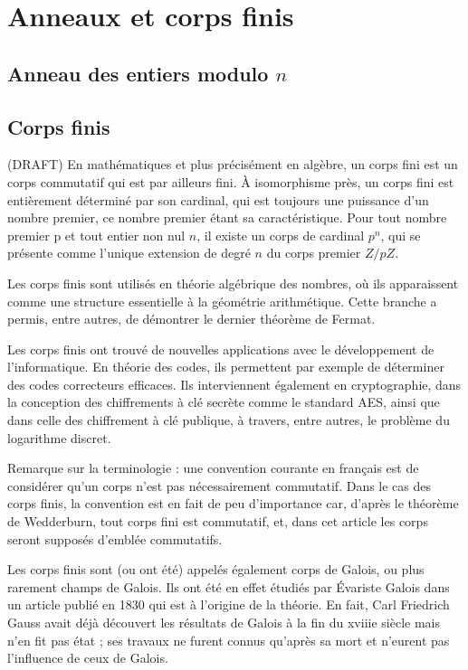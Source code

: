 \chapter{Anneaux et corps finis}
\section{Anneau des entiers modulo $n$}
\section{Corps finis}(DRAFT)
En mathématiques et plus précisément en algèbre, un corps fini est un corps commutatif qui est par ailleurs fini. À isomorphisme près, un corps fini est entièrement déterminé par son cardinal, qui est toujours une puissance d'un nombre premier, ce nombre premier étant sa caractéristique. Pour tout nombre premier p et tout entier non nul $n$, il existe un corps de cardinal $p^{n}$, qui se présente comme l'unique extension de degré $n$ du corps premier $Z/pZ$.

Les corps finis sont utilisés en théorie algébrique des nombres, où ils apparaissent comme une structure essentielle à la géométrie arithmétique. Cette branche a permis, entre autres, de démontrer le dernier théorème de Fermat.

Les corps finis ont trouvé de nouvelles applications avec le développement de l'informatique. En théorie des codes, ils permettent par exemple de déterminer des codes correcteurs efficaces. Ils interviennent également en cryptographie, dans la conception des chiffrements à clé secrète comme le standard AES, ainsi que dans celle des chiffrement à clé publique, à travers, entre autres, le problème du logarithme discret.

Remarque sur la terminologie : une convention courante en français est de considérer qu'un corps n'est pas nécessairement commutatif. Dans le cas des corps finis, la convention est en fait de peu d'importance car, d'après le théorème de Wedderburn, tout corps fini est commutatif, et, dans cet article les corps seront supposés d'emblée commutatifs.

Les corps finis sont (ou ont été) appelés également corps de Galois, ou plus rarement champs de Galois. Ils ont été en effet étudiés par Évariste Galois dans un article publié en 1830 qui est à l'origine de la théorie. En fait, Carl Friedrich Gauss avait déjà découvert les résultats de Galois à la fin du xviiie siècle mais n'en fit pas état ; ses travaux ne furent connus qu'après sa mort et n'eurent pas l'influence de ceux de Galois.

